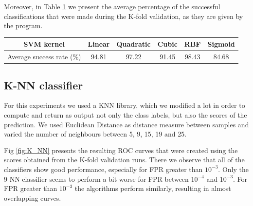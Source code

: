 \noindent Moreover, in Table \ref{table:SVM_success} we present the average percentage of the successful classifications that were made during the K-fold validation, as they are given by the program.

\begin{table}[h]
  \centering
  \begin{tabular}{ | c | c | c | c | c | c |}
  \hline
  SVM kernel & Linear & Quadratic & Cubic & RBF & Sigmoid \\ \hline
  Average success rate (\%) & 94.81 & 97.22 & 91.45 & 98.43 & 84.68 \\ \hline
  \end{tabular}
  \label{table:SVM_success}
\end{table}
    
\subsection{K-NN classifier}
\noindent For this experiments we used a KNN library, which we modified a lot in order to compute and return as output not only the class labels, but also the scores of the prediction.
We used Euclidean Distance as distance measure between samples and varied the number of neighbours between 5, 9, 15, 19 and 25. 

\noindent Fig \ref{fig:K_NN} presents the resulting ROC curves that were created using the scores obtained from the K-fold validation runs. There we observe that all of the classifiers show good performance, especially for FPR greater than $10^{-3}$. Only the 9-NN classifier seems to perform a bit worse for FPR between $10^{-4}$ and $10^{-3}$. For FPR greater than  $10^{-3}$
the algorithms perform similarly, resulting in almost overlapping curves.

